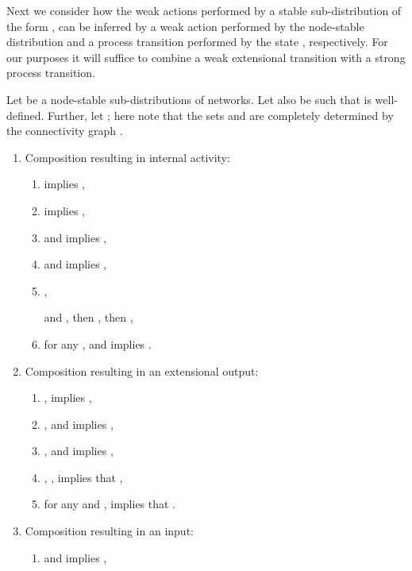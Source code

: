 \documentclass{LMCS}
\begin{document}
Next we consider how the weak actions performed by a stable sub-distribution of the form , can be inferred by a weak action performed by 
the node-stable distribution  and a process transition performed by the 
state , respectively. 
For our purposes it will suffice to combine a weak extensional transition with 
a strong process transition.

\begin{prop}
\label{prop:wea.comp}
	Let  be a 
	node-stable sub-distributions of networks. 
	Let also  be such that  is well-defined. Further, 
	let ; 
	here note that the sets  and  are 
	completely determined by the connectivity graph .
	\begin{enumerate}\item Composition resulting in internal activity:
	\begin{enumerate}[label=(\roman*)]
\item
     
implies 
 ,

\item  implies 
, 

\item  and 
 implies 
, 

\item  and 
 implies 
, 

\item , 
 
and , then , 
then ,

\item for any , 
 and  implies 
. 
\end{enumerate}

\item Composition resulting in an extensional output:
\begin{enumerate}[label=(\roman*)]
\item  ,  
  implies 
  ,

\item ,   
  and  
  implies 
  ,

\item ,   
  and  
  implies 
  ,

\item , , 
 implies that 
, 

\item  for any  
and ,   implies that 
. 
\end{enumerate}

\item Composition resulting in an input:
\begin{enumerate}[label=(\roman*)]
\item  and 
	 implies 
	, 
	

\end{enumerate}
\end{enumerate}
\end{prop}
\end{document}

